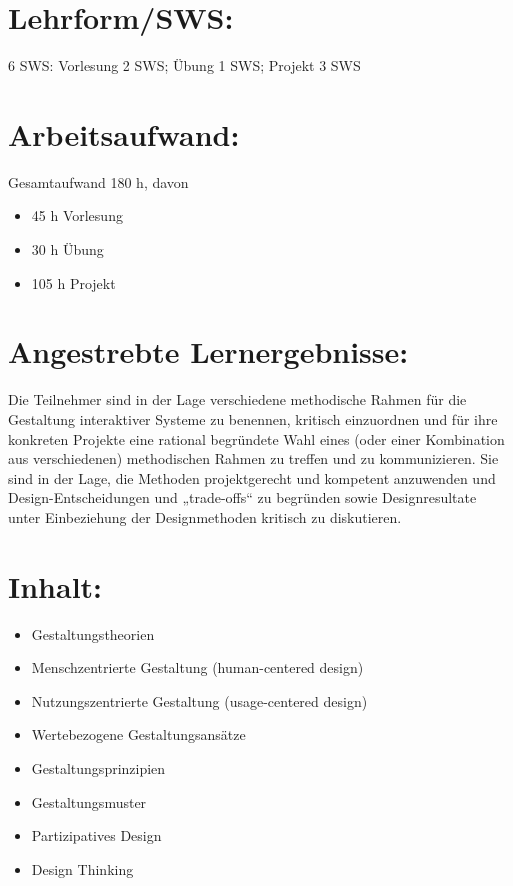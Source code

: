 \section*{Lehrform/SWS:}\label{lehrformsws-10}

6 SWS: Vorlesung 2 SWS; Übung 1 SWS; Projekt 3 SWS

\section*{Arbeitsaufwand:}\label{arbeitsaufwand-10}

Gesamtaufwand 180 h, davon

\begin{itemize}
\item
  45 h Vorlesung
\item
  30 h Übung
\item
  105 h Projekt
\end{itemize}

\section*{Angestrebte
Lernergebnisse:}\label{angestrebte-lernergebnisse-10}

Die Teilnehmer sind in der Lage verschiedene methodische Rahmen für die
Gestaltung interaktiver Systeme zu benennen, kritisch einzuordnen und
für ihre konkreten Projekte eine rational begründete Wahl eines (oder
einer Kombination aus verschiedenen) methodischen Rahmen zu treffen und
zu kommunizieren. Sie sind in der Lage, die Methoden projektgerecht und
kompetent anzuwenden und Design-Entscheidungen und „trade-offs`` zu
begründen sowie Designresultate unter Einbeziehung der Designmethoden
kritisch zu diskutieren.

\section*{Inhalt:}\label{inhalt-10}

\begin{itemize}
\item
  Gestaltungstheorien
\item
  Menschzentrierte Gestaltung (human-centered design)
\item
  Nutzungszentrierte Gestaltung (usage-centered design)
\item
  Wertebezogene Gestaltungsansätze
\item
  Gestaltungsprinzipien
\item
  Gestaltungsmuster
\item
  Partizipatives Design
\item
  Design Thinking
\end{itemize}

